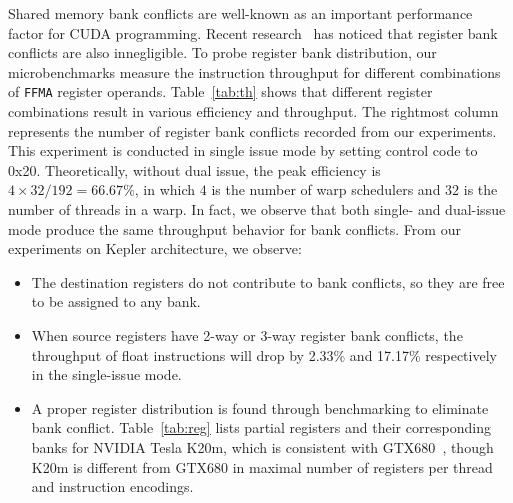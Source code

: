 Shared memory bank conflicts are well-known as an important performance factor for CUDA programming.
Recent research~\cite{lai} has noticed that register bank conflicts are also innegligible.
To probe register bank distribution, our microbenchmarks measure the instruction throughput for different combinations of {\tt FFMA} register operands.
Table~\ref{tab:th} shows that different register combinations result in various efficiency and throughput.
The rightmost column represents the number of register bank conflicts recorded from our experiments.
This experiment is conducted in single issue mode by setting control code to 0x20.
Theoretically, without dual issue, the peak efficiency is $4\times32/192=66.67\%$, in which $4$ is the number of warp schedulers and $32$
is the number of threads in a warp.
In fact, we observe that both single- and dual-issue mode produce the same throughput behavior for bank conflicts.
From our experiments on Kepler architecture, we observe:
\begin{itemize}
\item The destination registers do not contribute to bank conflicts, so they are free to be assigned to any bank.%
\item When source registers have 2-way or 3-way register bank conflicts, the throughput of float instructions will drop by 2.33\% and 17.17\% respectively in the single-issue mode.
\item A proper register distribution is found through benchmarking to eliminate bank conflict.
     Table~\ref{tab:reg} lists partial registers and their corresponding banks for NVIDIA Tesla K20m, which is consistent with GTX680~\cite{lai}, though K20m is different from GTX680 in maximal number of registers per thread and instruction encodings.

\end{itemize}


